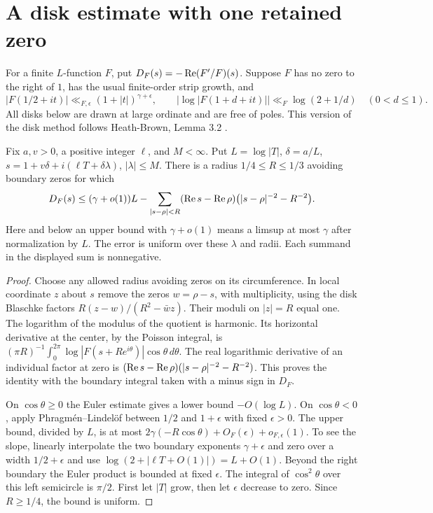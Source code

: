 \documentclass[11pt]{article}
\begin{document}
\section{A disk estimate with one retained zero}
For a finite $L$-function $F$, put $D_F(s)=-\operatorname{Re}(F'/F)(s)$. Suppose $F$ has no zero to the right of $1$, has the usual finite-order strip growth, and
\[
 |F(1/2+it)|\ll_{F,\epsilon}(1+|t|)^{\gamma+\epsilon},
 \qquad |\log |F(1+d+it)||\ll_F\log(2+1/d)\quad(0<d\le1).
\]
All disks below are drawn at large ordinate and are free of poles. This version of the disk method follows Heath-Brown, Lemma 3.2 \cite{HB}.
\begin{lemma}\label{disk}
Fix $a,v>0$, a positive integer $\ell$, and $M<\infty$. Put $L=\log|T|$, $\delta=a/L$, $s=1+v\delta+i(\ell T+\delta\lambda)$, $|\lambda|\le M$. There is a radius $1/4\le R\le1/3$ avoiding boundary zeros for which
\[
 D_F(s)\le (\gamma+o(1))L-
 \sum_{|s-\rho|<R}(\operatorname{Re} s-\operatorname{Re}\rho)
                  \big(|s-\rho|^{-2}-R^{-2}\big).
\]
Here and below an upper bound with $\gamma+o(1)$ means a limsup at most $\gamma$ after normalization by $L$. The error is uniform over these $\lambda$ and radii. Each summand in the displayed sum is nonnegative.
\end{lemma}
\begin{proof}
Choose any allowed radius avoiding zeros on its circumference. In local coordinate $z$ about $s$ remove the zeros $w=\rho-s$, with multiplicity, using the disk Blaschke factors $R(z-w)/(R^2-\bar w z)$. Their moduli on $|z|=R$ equal one. The logarithm of the modulus of the quotient is harmonic. Its horizontal derivative at the center, by the Poisson integral, is $(\pi R)^{-1}\int_0^{2\pi}\log |F(s+Re^{i\theta})|\cos\theta\,d\theta$. The real logarithmic derivative of an individual factor at zero is $(\operatorname{Re} s-\operatorname{Re}\rho)(|s-\rho|^{-2}-R^{-2})$. This proves the identity with the boundary integral taken with a minus sign in $D_F$.
 
On $\cos\theta\ge0$ the Euler estimate gives a lower bound $-O(\log L)$. On $\cos\theta<0$, apply Phragm\'en--Lindel\"of between $1/2$ and $1+\epsilon$ with fixed $\epsilon>0$. The upper bound, divided by $L$, is at most $2\gamma(-R\cos\theta)+O_F(\epsilon)+o_{F,\epsilon}(1)$. To see the slope, linearly interpolate the two boundary exponents $\gamma+\epsilon$ and zero over a width $1/2+\epsilon$ and use $\log(2+|\ell T+O(1)|)=L+O(1)$. Beyond the right boundary the Euler product is bounded at fixed $\epsilon$. The integral of $\cos^2\theta$ over this left semicircle is $\pi/2$. First let $|T|$ grow, then let $\epsilon$ decrease to zero. Since $R\ge1/4$, the bound is uniform.
\end{proof}
\end{document}
